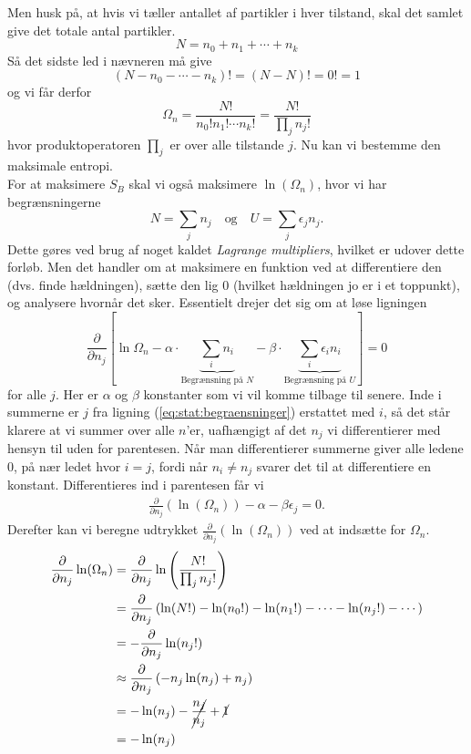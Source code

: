 Men husk på, at hvis vi tæller antallet af partikler i hver tilstand, skal det samlet give det totale antal partikler.
\[ N=n_0+n_1+\cdots+n_k \]
Så det sidste led i nævneren må give
\[ (N-n_0-\cdots -n_k)!= (N-N)! = 0! = 1 \]
og vi får derfor
\begin{equation}
	\Omega_n=\frac{N!}{n_0!n_1!\cdots n_k!}=\frac{N!}{\prod_j n_j!}
\end{equation}
hvor produktoperatoren $\prod_j$ er over alle tilstande $j$. Nu kan vi bestemme den maksimale entropi.\\[12pt]
For at maksimere $S_B$ skal vi også maksimere $\ln(\Omega_n)$, hvor vi har begrænsningerne
\begin{equation}
	N=\sum_j n_j\quad\text{og}\quad U=\sum_j\epsilon_jn_j. \label{eq:stat:begraensninger}
\end{equation}
Dette gøres ved brug af noget kaldet \emph{Lagrange multipliers}, hvilket er udover dette forløb. Men det handler om at maksimere en funktion ved at differentiere den (dvs. finde hældningen), sætte den lig 0 (hvilket hældningen jo er i et toppunkt), og analysere hvornår det sker. Essentielt drejer det sig om at løse ligningen
\begin{equation}
	\frac{\partial}{\partial n_j}\left[\ln\Omega_n-\alpha\cdot\underbrace{\sum_i n_i}_{\text{Begrænsning på $N$}}-\beta\cdot\underbrace{\sum_i\epsilon_in_i}_{\text{Begrænsning på $U$}}\right]=0
\end{equation}
for alle $j$. Her er $\alpha$ og $\beta$ konstanter som vi vil komme tilbage til senere. Inde i summerne er $j$ fra ligning (\ref{eq:stat:begraensninger}) erstattet med $i$, så det står klarere at vi summer over alle $n$'er, uafhængigt af det $n_j$ vi differentierer med hensyn til uden for parentesen. Når man differentierer summerne giver alle ledene 0, på nær ledet hvor $i = j$, fordi når $n_i \neq n_j$ svarer det til at differentiere en konstant. Differentieres ind i parentesen får vi
\begin{align}
     \frac{\partial}{\partial n_j}\left(\ln(\Omega_n)\right)-\alpha-\beta\epsilon_j=0. \label{eq:stat:diffOmega}
\end{align}{}
Derefter kan vi beregne udtrykket $\frac{\partial}{\partial n_j}\left(\ln(\Omega_n)\right)$ ved at indsætte for $\Omega_n$.
\begin{equation*}
\begin{split}
	\frac{\partial}{\partial n_j}\ln(\Omega_n)&=\frac{\partial}{\partial n_j}\ln\left(\frac{N!}{\prod_j n_j!}\right)\\
	&=\frac{\partial}{\partial n_j}\left(\ln (N!)-\ln (n_0!)-\ln (n_1!)-\cdots-\ln (n_j!)-\cdots\right)\\
	&=-\frac{\partial}{\partial n_j}\ln (n_j!)\\
	&\approx \frac{\partial}{\partial n_j}\left(-n_j\ln (n_j) + n_j\right)\\
	&=-\ln (n_j) -\cancel{\frac{n_j}{n_j}}+\cancel{1}\\
	&=-\ln (n_j)
\end{split}
\end{equation*}
